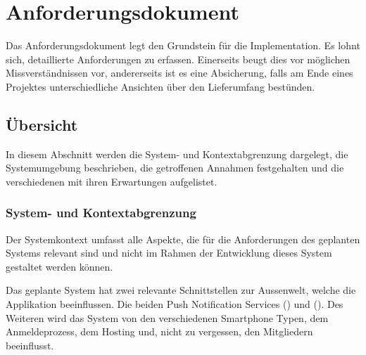%
%

\chapter{Anforderungsdokument}\label{chap.anforderungsdokument}

Das Anforderungsdokument legt den Grundstein für die Implementation. Es lohnt sich, detaillierte Anforderungen zu erfassen. Einerseits beugt dies vor möglichen Missverständnissen vor, andererseits ist es eine Absicherung, falls am Ende eines Projektes unterschiedliche Ansichten über den Lieferumfang bestünden.

\section{Übersicht}\label{anf_uebersicht}

In diesem Abschnitt werden die System- und Kontextabgrenzung dargelegt, die Systemumgebung beschrieben, die getroffenen Annahmen festgehalten und die verschiedenen  mit ihren Erwartungen aufgelistet.

\subsection{System- und Kontextabgrenzung}\label{systemabgrenzung}
Der Systemkontext umfasst alle Aspekte, die für die Anforderungen des geplanten Systems relevant sind und nicht im Rahmen der Entwicklung dieses System gestaltet werden können.

Das geplante System hat zwei relevante Schnittstellen zur Aussenwelt, welche die Applikation beeinflussen. Die beiden Push Notification Services  () und  (). Des Weiteren wird das System von den verschiedenen Smartphone Typen, dem Anmeldeprozess, dem Hosting und, nicht zu vergessen, den Mitgliedern beeinflusst.

